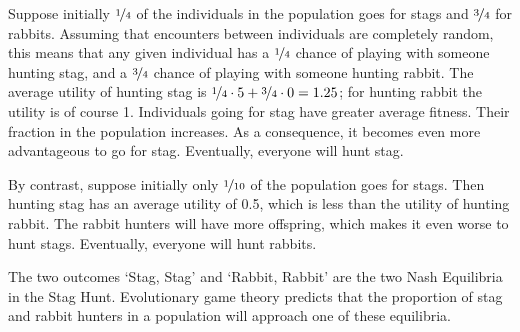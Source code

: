 Suppose initially $\nicefrac{1}{4}$ of the individuals in the population goes
for stags and $\nicefrac{3}{4}$ for rabbits. Assuming that encounters between
individuals are completely random, this means that any given individual has a
$\nicefrac{1}{4}$ chance of playing with someone hunting stag, and a
$\nicefrac{3}{4}$ chance of playing with someone hunting rabbit. The average
utility of hunting stag is
$\nicefrac{1}{4} \cdot 5 + \nicefrac{3}{4} \cdot 0 = 1.25$; for hunting rabbit
the utility is of course 1. Individuals going for stag have greater average
fitness. Their fraction in the population increases. As a consequence, it
becomes even more advantageous to go for stag. Eventually, everyone will hunt
stag.

By contrast, suppose initially only $\nicefrac{1}{10}$ of the population goes
for stags. Then hunting stag has an average utility of 0.5, which is less than
the utility of hunting rabbit. The rabbit hunters will have more offspring,
which makes it even worse to hunt stags. Eventually, everyone will hunt rabbits.

The two outcomes `Stag, Stag' and `Rabbit, Rabbit' are the two Nash Equilibria
in the Stag Hunt. Evolutionary game theory predicts that the proportion of stag
and rabbit hunters in a population will approach one of these equilibria.



